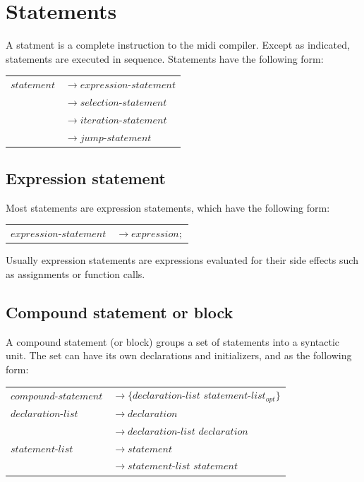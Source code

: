 \documentclass[12pt,A4]{book}
\begin{document}
\section{Statements}
A statment is a complete instruction to the midi compiler. Except as indicated, statements are executed in sequence.  Statements have the following form:

\begin{tabular}{l l}
$statement$ & $\rightarrow expression\mbox{-}statement$\\
& $\rightarrow selection\mbox{-}statement$\\
& $\rightarrow iteration\mbox{-}statement$\\
& $\rightarrow jump\mbox{-}statement$\\
\end{tabular}

\subsection{Expression statement}
Most statements are expression statements, which have the following form:

\begin{tabular}{l l}
$expression\mbox{-}statement$ & $\rightarrow expression;$
\end{tabular}

Usually expression statements are expressions evaluated for their side effects such as assignments or function calls.
\subsection{Compound statement or block}
A compound statement (or block) groups a set of statements into a syntactic unit.  The set can have its own declarations and initializers, and as the following form:

\begin{tabular}{l l}
$compound\mbox{-}statement$  & $\rightarrow \{declaration\mbox{-}list$ $statement\mbox{-}list_{opt}\}$\\
$declaration\mbox{-}list$ & $\rightarrow declaration$\\
& $\rightarrow declaration\mbox{-}list$ $declaration$\\
$statement\mbox{-}list$  & $\rightarrow statement$\\
& $\rightarrow statement\mbox{-}list$ $statement$\\
\end{tabular}
\end{document}
